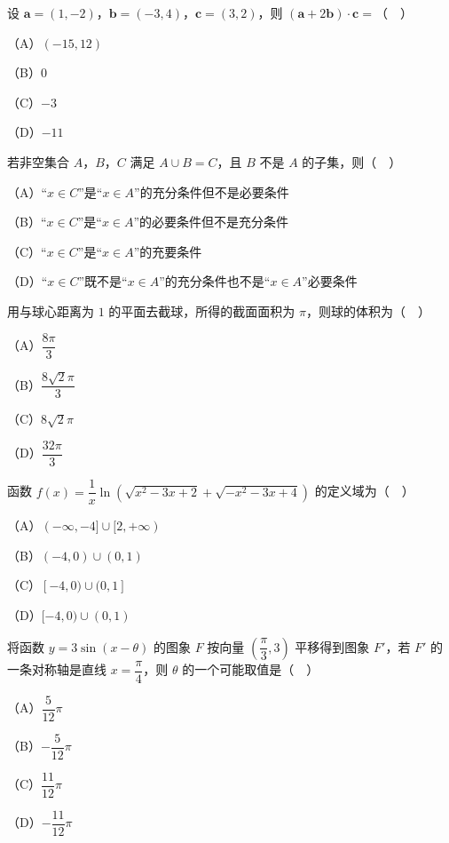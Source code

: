 


\begin{question}
设 $\boldsymbol a=(1,-2)$，$\boldsymbol b=(-3,4)$，$\boldsymbol c=(3,2)$，则 $(\boldsymbol a+2\boldsymbol b)\cdot\boldsymbol c=$（　）

（A）$(-15,12)$

（B）$0$

（C）$-3$

（D）$-11$

\end{question}
\begin{question}
若非空集合 $A$，$B$，$C$ 满足 $A\cup B=C$，且 $B$ 不是 $A$ 的子集，则（　）

（A）“$x\in C$”是“$x\in A$”的充分条件但不是必要条件

（B）“$x\in C$”是“$x\in A$”的必要条件但不是充分条件

（C）“$x\in C$”是“$x\in A$”的充要条件

（D）“$x\in C$”既不是“$x\in A$”的充分条件也不是“$x\in A$”必要条件

\end{question}
\begin{question}
用与球心距离为 $1$ 的平面去截球，所得的截面面积为 $\pi$，则球的体积为（　）

（A）$\dfrac{8\pi}3$

（B）$\dfrac{8\sqrt2\pi}3$

（C）$8\sqrt2\pi$

（D）$\dfrac{32\pi}3$

\end{question}
\begin{question}
函数 $f(x)=\dfrac1x\ln\left(\sqrt{x^2-3x+2}+\sqrt{-x^2-3x+4}\right)$ 的定义域为（　）

（A）$(-\infty,-4]\cup[2,+\infty)$

（B）$(-4,0)\cup(0,1)$

（C）$[-4,0)\cup(0,1]$

（D）$[-4,0)\cup(0,1)$

\end{question}
\begin{question}
将函数 $y=3\sin(x-\theta)$ 的图象 $F$ 按向量 $\left(\dfrac{\pi}3,3\right)$ 平移得到图象 $F'$，若 $F'$ 的一条对称轴是直线 $x=\dfrac{\pi}4$，则 $\theta$ 的一个可能取值是（　）

（A）$\dfrac5{12}\pi$

（B）$-\dfrac5{12}\pi$

（C）$\dfrac{11}{12}\pi$

（D）$-\dfrac{11}{12}\pi$

\end{question}
